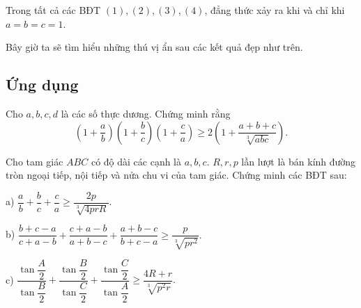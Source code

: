 {\noindent 
Trong tất cả các BĐT $(1), (2), (3), (4)$, đẳng thức xảy ra khi và chỉ khi $a = b = c= 1$.

\noindent 
Bây giờ ta sẽ tìm hiểu những thú vị ẩn sau các kết quả đẹp như trên.

\subsection{Ứng dụng}

\begin{bt}[APMO, 1998]%
	Cho $a, b, c, d$ là các số thực dương. Chứng minh rằng
	$$\left( {1 + \frac{a}{b}} \right)\left( {1 + \frac{b}{c}} \right)\left( {1 + \frac{c}{a}} \right) \ge 2\left( {1 + \frac{{a + b + c}}{{\sqrt[3]{{abc}}}}} \right).$$
\end{bt}

\begin{bt}%
	Cho tam giác $ABC$ có độ dài các cạnh là $a,b,c$. $R, r,p$ lần lượt là bán kính đường tròn ngoại tiếp, nội tiếp và nửa chu vi của tam giác. Chứng minh các BĐT sau: 
	
	\noindent	
	a)	$ \dfrac{a}{b} + \dfrac{b}{c} + \dfrac{c}{a} \ge \dfrac{{2p}}{{\sqrt[3]{{4prR}}}}. $ 
	
	\noindent	
	b) 	$ \dfrac{b+c-a}{c+a-b} + \dfrac{c+a-b}{a+b-c} + \dfrac{a+b-c}{b+c-a} \ge \dfrac{{p}}{{\sqrt[3]{{pr^2}}}}.$  
	
	\noindent
	c)   $  \dfrac{{\tan \dfrac{A}{2}}}{{\tan \dfrac{B}{2}}} + \dfrac{{\tan \dfrac{B}{2}}}{{\tan \dfrac{C}{2}}} + \dfrac{{\tan \dfrac{C}{2}}}{{\tan \dfrac{A}{2}}} \ge \dfrac{{4R + r}}{{\sqrt[3]{{{p^2}r}}}}.$
	
\end{bt}}
